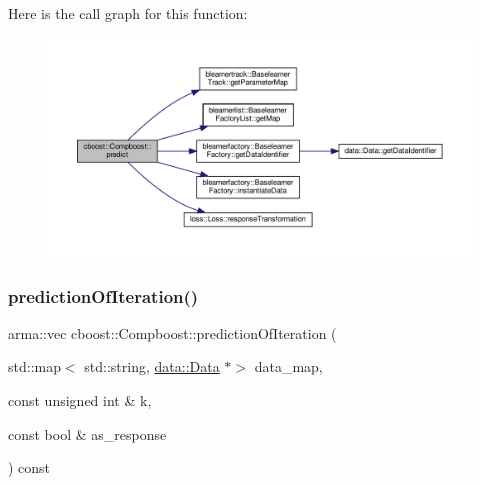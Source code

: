 Here is the call graph for this function\+:\nopagebreak
\begin{figure}[H]
\begin{center}
\leavevmode
\includegraphics[width=350pt]{classcboost_1_1_compboost_a51c59cdddec77c2bed757aadad6afe1d_cgraph}
\end{center}
\end{figure}
\mbox{\label{classcboost_1_1_compboost_abd00401a8914cde27a93673e12ab3468}} 
\subsubsection{\texorpdfstring{prediction\+Of\+Iteration()}{predictionOfIteration()}}
{\footnotesize\ttfamily arma\+::vec cboost\+::\+Compboost\+::prediction\+Of\+Iteration (\begin{DoxyParamCaption}\item[{std\+::map$<$ std\+::string, \hyperlink{classdata_1_1_data}{data\+::\+Data} $\ast$$>$}]{data\+\_\+map,  }\item[{const unsigned int \&}]{k,  }\item[{const bool \&}]{as\+\_\+response }\end{DoxyParamCaption}) const}

